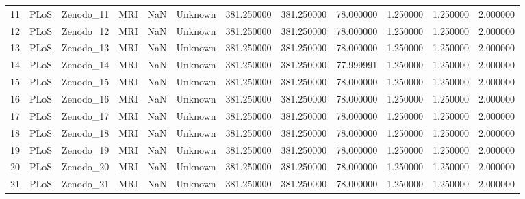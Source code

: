 \begin{tabular}{llllrlrrrrrr}
11     &            PLoS &    Zenodo\_11 &                MRI &        NaN &  Unknown &       381.250000 &    381.250000 &   78.000000 &               1.250000 &            1.250000 &          2.000000 \\
12     &            PLoS &    Zenodo\_12 &                MRI &        NaN &  Unknown &       381.250000 &    381.250000 &   78.000000 &               1.250000 &            1.250000 &          2.000000 \\
13     &            PLoS &    Zenodo\_13 &                MRI &        NaN &  Unknown &       381.250000 &    381.250000 &   78.000000 &               1.250000 &            1.250000 &          2.000000 \\
14     &            PLoS &    Zenodo\_14 &                MRI &        NaN &  Unknown &       381.250000 &    381.250000 &   77.999991 &               1.250000 &            1.250000 &          2.000000 \\
15     &            PLoS &    Zenodo\_15 &                MRI &        NaN &  Unknown &       381.250000 &    381.250000 &   78.000000 &               1.250000 &            1.250000 &          2.000000 \\
16     &            PLoS &    Zenodo\_16 &                MRI &        NaN &  Unknown &       381.250000 &    381.250000 &   78.000000 &               1.250000 &            1.250000 &          2.000000 \\
17     &            PLoS &    Zenodo\_17 &                MRI &        NaN &  Unknown &       381.250000 &    381.250000 &   78.000000 &               1.250000 &            1.250000 &          2.000000 \\
18     &            PLoS &    Zenodo\_18 &                MRI &        NaN &  Unknown &       381.250000 &    381.250000 &   78.000000 &               1.250000 &            1.250000 &          2.000000 \\
19     &            PLoS &    Zenodo\_19 &                MRI &        NaN &  Unknown &       381.250000 &    381.250000 &   78.000000 &               1.250000 &            1.250000 &          2.000000 \\
20     &            PLoS &    Zenodo\_20 &                MRI &        NaN &  Unknown &       381.250000 &    381.250000 &   78.000000 &               1.250000 &            1.250000 &          2.000000 \\
21     &            PLoS &    Zenodo\_21 &                MRI &        NaN &  Unknown &       381.250000 &    381.250000 &   78.000000 &               1.250000 &            1.250000 &          2.000000 \\

\end{tabular}
